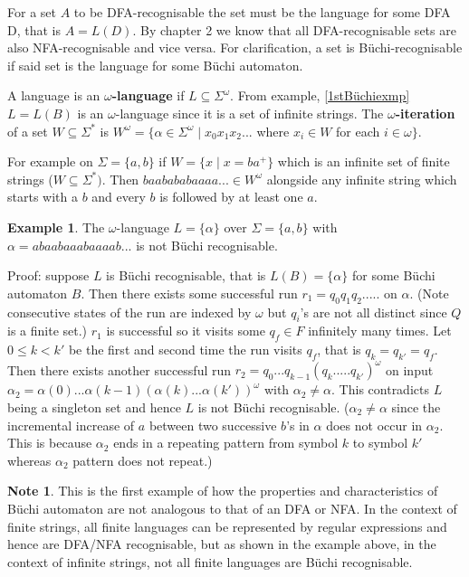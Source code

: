 \documentclass[a4paper,12pt]{report}
\theoremstyle{definition}
\newtheorem{exmp}{Example}[subsection]
\newtheorem{note}{Note}[subsection]
\begin{document}
\noindent For a set $A$ to be DFA-recognisable the set must be the language for some DFA D, that is $A=L(D)$. By chapter 2 we know that all DFA-recognisable sets are also NFA-recognisable and vice versa. For clarification, a set is Büchi-recognisable if said set is the language for some Büchi automaton. 

\noindent A language is an $\omega$\textbf{-language} if $L\subseteq\Sigma^\omega$. From example, \ref{1stBüchiexmp} $L=L(B)$ is an $\omega$-language since it is a set of infinite strings.  The $\omega$\textbf{-iteration} of a set $W\subseteq \Sigma^*$ is 
$W^\omega= \{\alpha\in\Sigma^\omega \mid x_0x_1x_2...$ where $ x_i \in W$  for each $i\in\omega\}$.

For example on $\Sigma =\{a,b\}$ if $W=\{x \mid x=ba^+\}$ which is an infinite set of finite strings ($W\subseteq \Sigma^*)$. Then $baabababaaaa...\in W^\omega$ alongside any infinite string which starts with a $b$ and every $b$ is followed by at least one $a$.
\smallskip

\begin{exmp}
The $\omega$-language $L=\{\alpha\}$ over $\Sigma=\{a,b\}$ with $\alpha=abaabaaabaaaab...$ is not Büchi recognisable. 


Proof: suppose $L$ is Büchi recognisable, that is $L(B)=\{\alpha\}$ for some Büchi automaton $B$.
Then there exists some successful run $r_1=q_0q_1q_2.....$ on $\alpha$. (Note consecutive states of the run are indexed by $\omega$ but $q_i$'s are not all distinct since $Q$ is a finite set.) $r_1$ is successful so it visits some $q_f \in F$ infinitely many times. Let $0\leq k< k'$ be the first and second time the run visits $q_f$, that is $q_k=q_{k'}=q_f$. 
Then there exists another successful run $r_2=q_0...q_{k-1}(q_k.....q_{k'})^\omega$ on input $\alpha_2=\alpha(0)...\alpha(k-1)(\alpha(k)...\alpha(k'))^\omega $ with  $\alpha_2 \neq  \alpha$. This contradicts $L$ being a singleton set and hence $L$ is not Büchi recognisable. ($\alpha_2 \neq  \alpha$ since the incremental increase of $a$ between two successive $b$'s in $\alpha$ does not occur in $\alpha_2$. This is because $\alpha_2$ ends in a repeating pattern from symbol $k$ to symbol $k'$ whereas $\alpha_2$ pattern does not repeat.) 
\end{exmp}

\begin{note}
This is the first example of how the properties and characteristics of Büchi automaton are not analogous to that of an DFA or NFA. In the context of finite strings, all finite languages can be represented by regular expressions and hence are DFA/NFA recognisable, but as shown in the example above, in the context of infinite strings, not all finite languages are Büchi recognisable. 
\end{note}
\end{document}
